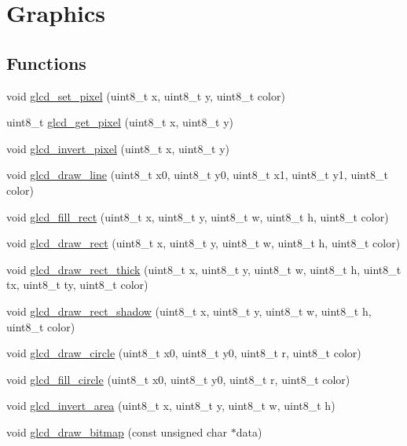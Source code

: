 \hypertarget{group___graphics}{}\section{Graphics}
\label{group___graphics}
\subsection*{Functions}
\begin{DoxyCompactItemize}
\item 
void \hyperlink{group___graphics_gaad4f2c4243099dc3cf88b9ba98b71a9d}{glcd\+\_\+set\+\_\+pixel} (uint8\+\_\+t x, uint8\+\_\+t y, uint8\+\_\+t color)
\item 
uint8\+\_\+t \hyperlink{group___graphics_ga5192f0cdb3d5daf0f97e3c8870d4ff23}{glcd\+\_\+get\+\_\+pixel} (uint8\+\_\+t x, uint8\+\_\+t y)
\item 
void \hyperlink{group___graphics_gad4a67c658c79370813d69648680d7008}{glcd\+\_\+invert\+\_\+pixel} (uint8\+\_\+t x, uint8\+\_\+t y)
\item 
void \hyperlink{group___graphics_ga8dbb8d7606a67e9f7b8ae6cfc633bbe2}{glcd\+\_\+draw\+\_\+line} (uint8\+\_\+t x0, uint8\+\_\+t y0, uint8\+\_\+t x1, uint8\+\_\+t y1, uint8\+\_\+t color)
\item 
void \hyperlink{group___graphics_gaa56253e0033a874217d3b0fb86bb7ee3}{glcd\+\_\+fill\+\_\+rect} (uint8\+\_\+t x, uint8\+\_\+t y, uint8\+\_\+t w, uint8\+\_\+t h, uint8\+\_\+t color)
\item 
void \hyperlink{group___graphics_ga1cac5dc93f1be733184cffb348e34bcc}{glcd\+\_\+draw\+\_\+rect} (uint8\+\_\+t x, uint8\+\_\+t y, uint8\+\_\+t w, uint8\+\_\+t h, uint8\+\_\+t color)
\item 
void \hyperlink{group___graphics_ga98f91d8094d21d2dcc6d9aaebb4c7802}{glcd\+\_\+draw\+\_\+rect\+\_\+thick} (uint8\+\_\+t x, uint8\+\_\+t y, uint8\+\_\+t w, uint8\+\_\+t h, uint8\+\_\+t tx, uint8\+\_\+t ty, uint8\+\_\+t color)
\item 
void \hyperlink{group___graphics_ga92295395cf0e6b123c9a1a845b679b63}{glcd\+\_\+draw\+\_\+rect\+\_\+shadow} (uint8\+\_\+t x, uint8\+\_\+t y, uint8\+\_\+t w, uint8\+\_\+t h, uint8\+\_\+t color)
\item 
void \hyperlink{group___graphics_ga0fee5866d7e323e98f17cf912f471944}{glcd\+\_\+draw\+\_\+circle} (uint8\+\_\+t x0, uint8\+\_\+t y0, uint8\+\_\+t r, uint8\+\_\+t color)
\item 
void \hyperlink{group___graphics_ga8b94c2f0404e9ba8232ed8a1785e100b}{glcd\+\_\+fill\+\_\+circle} (uint8\+\_\+t x0, uint8\+\_\+t y0, uint8\+\_\+t r, uint8\+\_\+t color)
\item 
void \hyperlink{group___graphics_ga4da9ce4ca69f8aba67221f444639b6ec}{glcd\+\_\+invert\+\_\+area} (uint8\+\_\+t x, uint8\+\_\+t y, uint8\+\_\+t w, uint8\+\_\+t h)
\item 
void \hyperlink{group___graphics_gad667b851f87d6330d00a7b43937cea2f}{glcd\+\_\+draw\+\_\+bitmap} (const unsigned char $\ast$data)
\end{DoxyCompactItemize}


